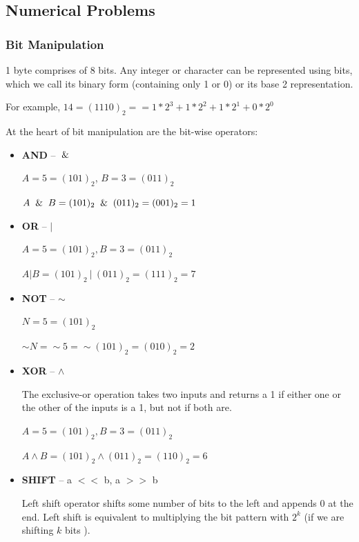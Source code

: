 \documentclass{article}
\begin{document}
    \subsection{Numerical Problems}
    
    \subsubsection{Bit Manipulation}
    1 byte comprises of 8 bits. Any integer or character can be represented using bits, which we call its binary form (containing only 1 or 0) or its base 2 representation.
    
    For example, $14 = (1110)_2 = = 1 * 2^3 + 1 * 2^2 + 1 * 2^1 + 0 * 2^0$  
    
    At the heart of bit manipulation are the bit-wise operators: 
    \begin{itemize}
        \item \textbf{AND} -- $\And$ 
        
        $A = 5 = (101)_2$, $B = 3 = (011)_2$

        $A \And B = (101)_2  \And (011)_2 = (001)_2 = 1$
        
        \item \textbf{OR} -- $\vert$ 
        
        $A = 5 = (101)_2 , B = 3 = (011)_2$
        
        $A \vert B = (101)_2 \  \vert \ (011)_2 = (111)_2 = 7$
        
        \item\textbf{NOT} -- $\sim$ 
        
        $N = 5 = (101)_2$
        
        $\sim N = \sim 5 = \sim (101)_2 = (010)_2 = 2$
        
        \item \textbf{XOR} -- $\wedge$ 
        
        The exclusive-or operation takes two inputs and returns a 1 if either one or the other of the inputs is a 1, but not if both are.
        
        $A = 5 = (101)_2 , B = 3 = (011)_2$
        
        $A \wedge B = (101)_2 \wedge (011)_2 = (110)_2 = 6$
        
        \item  \textbf{SHIFT} -- a $<<$ b, a $>>$ b
        
        Left shift operator shifts some number of bits to the left and appends 0 at the end. Left shift is equivalent to multiplying the bit pattern with $2^k$ (if we are shifting $k$ bits ).
        

\end{itemize}
\end{document}

